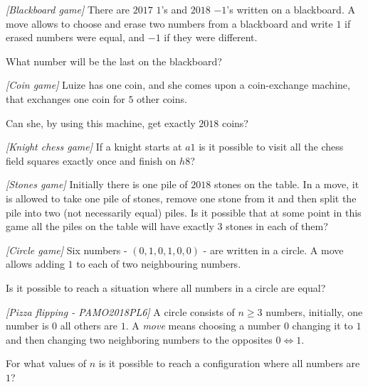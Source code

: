 

%




\noindent 



\begin{problem}
\textit{[Blackboard game]}
There are $2017$ $1$'s and $2018$ $-1$'s written on a blackboard. A move allows to choose and erase two numbers from a blackboard and write $1$ if erased numbers were equal, and $-1$ if they were different. 

What number will be the last on the blackboard?
\end{problem}
%

\begin{problem}
\textit{[Coin game]}
Luize has one coin, and she comes upon a coin-exchange machine, that exchanges one coin for $5$ other coins. 

Can she, by using this machine, get exactly $2018$ coins? 
\end{problem}
%

\begin{problem}
\textit{[Knight chess game]}
If a knight starts at $a1$ is it possible to visit all the chess field squares exactly once and finish on $h8$?
\end{problem}
%

\begin{problem}
\textit{[Stones game]}
Initially there is one pile of $2018$ stones on the table. In a move, it is allowed to take one pile of stones, remove one stone from it and then split the pile into two (not necessarily equal) piles. 
Is it possible that at some point in this game all the piles on the table will have exactly $3$ stones in each of them?
\end{problem}
%

\begin{problem}
\textit{[Circle game]}
Six numbers - $(0,1,0,1,0,0)$ - are written in a circle. A move allows adding $1$ to each of two neighbouring numbers. 

Is it possible to reach a situation where all numbers in a circle are equal?
\end{problem}
%

\begin{problem}
\textit{[Pizza flipping - PAMO2018PL6]}
A circle consists of $n\ge3$ numbers, initially, one number is $0$ all others are $1$. A \textit{move} means choosing a number $0$ changing it to $1$ and then changing two neighboring numbers to the opposites $0\Leftrightarrow1$.

For what values of $n$ is it possible to reach a configuration where all numbers are $1$?
\end{problem}
%



